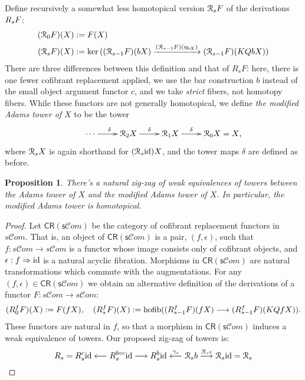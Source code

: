 \documentclass[11pt]{amsart}
\theoremstyle{plain}
\newtheorem{prop}[thm]{Proposition}
\theoremstyle{definition}
\renewcommand{\ker}{\textup{ker}\,}
\DeclareMathOperator*{\hofib}{hofib}
\renewcommand{\to}{\longrightarrow}
\newcommand{\from}{\longleftarrow}
\newcommand{\scrC}{\mathscr{C}}
\newcommand{\calR}{\mathcal{R}}
\theoremstyle{plain}
\newcommand{\Id}{\textup{id}}
\newcommand{\algcat}{{\scrC\!\textit{om}}}%
\newcommand{\dupdown}[2]{R_{\smash{#1}}}
\newcommand{\caldup}[1]{\calR_{\smash{#1}}}
\newcommand{\plainD}{R}
\newcommand{\barConstructionMightAbbreviate}{b}
\begin{document}
\begin{Bousfield-Kan spectral sequence}
Define recursively a somewhat less homotopical version $\caldup{s}F$ of the derivations $\dupdown{s}{}F$:
\begin{alignat*}{2}
(\caldup{0}F)(X)
&:=
F(X)%
\\
(\caldup{s}F)(X)
&:=
\ker((\caldup{s-1}F)(\barConstructionMightAbbreviate X)\xrightarrow{(\caldup{s-1}F)(\eta_{\barConstructionMightAbbreviate X})} (\caldup{s-1}F)(KQ\barConstructionMightAbbreviate X))
\end{alignat*}
There are three differences between this definition and that of $\plainD_sF$: here, there is one fewer cofibrant replacement applied, we use the bar construction $\barConstructionMightAbbreviate $ instead of the small object argument functor $c$, and we take \emph{strict} fibers, not homotopy fibers.
While these functors are not generally homotopical, we define \emph{the modified Adams tower of $X$} to be the tower
\[\xymatrix@R=4mm{
\cdots 
\ar[r]^{\delta}
&%
\caldup{2}X
\ar[r]^{\delta}
&%
\caldup{1}X
\ar[r]^{\delta}&%
\caldup{0}X\makebox[0cm][l]{${}=X$,}
}\]
where $\caldup{s}X$ is again shorthand for $(\caldup{s}\Id )X$, and the tower maps $\delta$ are defined as before.
\begin{prop}\label{prop:modifiedAdamsTower}
There's a natural zig-zag of weak equivalences of towers between the Adams tower of $X$ and the modified Adams tower of $X$. In particular, the modified Adams tower is homotopical.
\end{prop}
\begin{proof}
Let $\mathsf{CR(s\algcat)}$ be the category of cofibrant replacement functors in $s\algcat$. That is, an object of $\mathsf{CR(s\algcat)}$ is a pair, $(f,\epsilon)$, such that $f:s\algcat\to s\algcat$ is a functor whose image consists only of cofibrant objects, and $\epsilon:f\Rightarrow \Id $ is a natural acyclic fibration. Morphisms in $\mathsf{CR(s\algcat)}$ are natural transformations which commute with the augmentations. For any $(f,\epsilon)\in\mathsf{CR(s\algcat)}$ we obtain an alternative definition of the derivations of a functor $F:s\algcat\to s\algcat$:
\begin{alignat*}{2}
(\plainD_{\smash{0}}^{\smash{f}}F)(X)
:=
F(fX),\quad %
(\plainD_{\smash{s}}^{\smash{f}}F)(X)
:=
\hofib((\plainD_{\smash{s-1}}^{\smash{f}}F)(fX)\to (\plainD_{\smash{s-1}}^{\smash{f}}F)(KQfX)).
\end{alignat*}
These functors are natural in $f$, so that a morphism in $\mathsf{CR(s\algcat)}$ induces a weak equivalence of towers. Our proposed zig-zag of towers is: 
\[\plainD_{\smash{s}}= \plainD_{\smash{s}}^{\smash{c}}\Id \overset{}{\from}\plainD_{\smash{s}}^{\smash{\barConstructionMightAbbreviate \circ c}}\Id \overset{}{\to}\plainD_{\smash{s}}^{\smash{\barConstructionMightAbbreviate }}\Id \overset{\gamma_s}{\from}\caldup{s}\barConstructionMightAbbreviate \overset{\caldup{s}\epsilon}{\to}\caldup{s}\Id =\caldup{s}\]

\end{proof}
\end{Bousfield-Kan spectral sequence}
\end{document}
